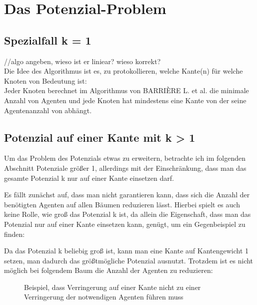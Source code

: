 \section{Das Potenzial-Problem}

\subsection{Spezialfall k = 1}
//algo angeben, wieso ist er liniear? wieso korrekt?\\


Die Idee des Algorithmus ist es, zu protokollieren, welche Kante(n) für welche Knoten von Bedeutung ist:\\

Jeder Knoten berechnet im Algorithmus von BARRIÈRE L. et al. die minimale Anzahl von Agenten und jede Knoten hat mindestens eine Kante von der seine Agentenanzahl von abhängt.

\subsection{Potenzial auf einer Kante mit k > 1}

Um das Problem des Potenzials etwas zu erweitern, betrachte ich im folgenden Abschnitt Potenziale größer 1, allerdings mit der Einschränkung, dass man das gesamte Potenzial k nur auf einer Kante einsetzen darf.

Es fällt zunächst auf, dass man nicht garantieren kann, dass sich die Anzahl der benötigten Agenten auf allen Bäumen reduzieren lässt. Hierbei spielt es auch keine Rolle, wie groß das Potenzial k ist, da allein die Eigenschaft, dass man das Potenzial nur auf einer Kante einsetzen kann, genügt, um ein Gegenbeispiel zu finden:

Da das Potenzial k beliebig groß ist, kann man eine Kante auf Kantengewicht 1 setzen, man dadurch das größtmögliche Potenzial ausnutzt. Trotzdem ist es nicht möglich bei folgendem Baum die Anzahl der Agenten zu reduzieren:

\begin{figure}[h]
	\caption{Beispiel, dass Verringerung auf einer Kante nicht zu einer Verringerung der notwendigen Agenten führen muss} 
\end{figure} 

